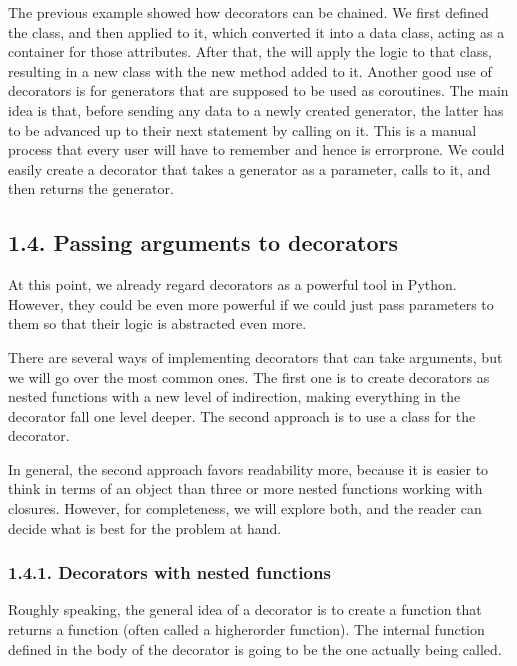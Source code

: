 \documentclass[a4paper,10pt,english]{sphinxmanual}
\begin{document}
The previous example showed how decorators can be chained. We first defined the class,
and then applied  to it, which converted it into a data class, acting as a
container for those attributes. After that, the  will apply the logic to that
class, resulting in a new class with the new  method added to it.
Another good use of decorators is for generators that are supposed to be used as
coroutines. The main idea is that, before sending any data to a newly created generator,
the latter has to be advanced up to their next  statement by calling  on it. This
is a manual process that every user will have to remember and hence is error\sphinxhyphen{}prone. We
could easily create a decorator that takes a generator as a parameter, calls  to it, and
then returns the generator.


\subsection{1.4. Passing arguments to decorators}
\label{\detokenize{chapters/5_decorators/index:passing-arguments-to-decorators}}
At this point, we already regard decorators as a powerful tool in Python. However, they
could be even more powerful if we could just pass parameters to them so that their logic is
abstracted even more.

There are several ways of implementing decorators that can take arguments, but we will go
over the most common ones. The first one is to create decorators as nested functions with a
new level of indirection, making everything in the decorator fall one level deeper. The
second approach is to use a class for the decorator.

In general, the second approach favors readability more, because it is easier to think in
terms of an object than three or more nested functions working with closures. However, for
completeness, we will explore both, and the reader can decide what is best for the problem
at hand.


\subsubsection{1.4.1. Decorators with nested functions}
\label{\detokenize{chapters/5_decorators/index:decorators-with-nested-functions}}
Roughly speaking, the general idea of a decorator is to create a function that returns a
function (often called a higher\sphinxhyphen{}order function). The internal function defined in the body of
the decorator is going to be the one actually being called.
\end{document}
